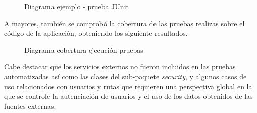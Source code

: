 \begin{figure}[H]
\centering
{}
\caption{Diagrama ejemplo - prueba JUnit}
\end{figure}


A mayores, también se comprobó la cobertura de las pruebas realizas sobre el código de la aplicación, obteniendo los siguiente resultados.

\begin{figure}[H]
\centering
{}
\caption{Diagrama cobertura ejecución pruebas}
\end{figure}

Cabe destacar que los servicios externos no fueron incluidos en las pruebas automatizadas así como las clases del sub-paquete \textit{security}, y algunos casos de uso relacionados con usuarios y rutas que requieren una perspectiva global en la que se controle la autenciación de usuarios y el uso de los datos obtenidos de las fuentes externas.


